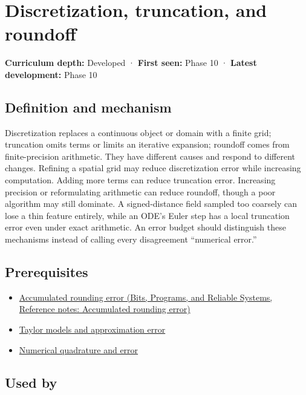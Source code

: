 \hypertarget{appendix-6b0648b2b8e8}{}\label{referencestart:appendix-6b0648b2b8e8}
\section{Discretization, truncation, and roundoff}\label{appendix-6b0648b2b8e8-discretization-truncation-and-roundoff}

\textbf{Curriculum depth:} Developed · \textbf{First seen:} Phase 10 · \textbf{Latest development:} Phase 10

\subsection{Definition and mechanism}\label{appendix-6b0648b2b8e8-definition-and-mechanism}

Discretization replaces a continuous object or domain with a finite grid; truncation omits terms or limits an iterative expansion; roundoff comes from finite-precision arithmetic. They have different causes and respond to different changes. Refining a spatial grid may reduce discretization error while increasing computation. Adding more terms can reduce truncation error. Increasing precision or reformulating arithmetic can reduce roundoff, though a poor algorithm may still dominate. A signed-distance field sampled too coarsely can lose a thin feature entirely, while an ODE's Euler step has a local truncation error even under exact arithmetic. An error budget should distinguish these mechanisms instead of calling every disagreement ``numerical error.''

\subsection{Prerequisites}\label{appendix-6b0648b2b8e8-prerequisites}

\begin{itemize}
\tightlist
\item
  \href{../01-Bits-Programs-and-Reliable-Systems/main.pdf\#nameddest=appendix-f82e270791c8}{Accumulated rounding error (Bits, Programs, and Reliable Systems, Reference notes: Accumulated rounding error)}
\item
  \hyperref[appendix-32f39e9a3738]{Taylor models and approximation error}
\item
  \hyperref[appendix-80521eae6b71]{Numerical quadrature and error}
\end{itemize}

\subsection{Used by}\label{appendix-6b0648b2b8e8-used-by}

